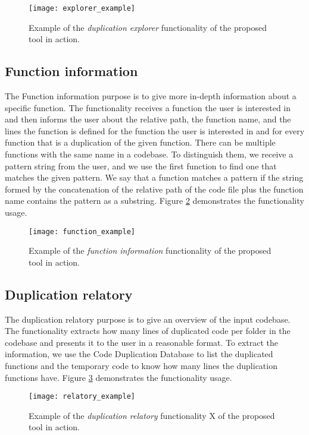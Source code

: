 \begin{figure}
\texttt{[image: explorer\_example]}
\caption{Example of the \textit{duplication explorer} functionality of the proposed tool in action.}
\label{fig:explorer_ex}
\end{figure}


\subsection{Function information}

\label{subsec:functioncommand}

The Function information purpose is to give more in-depth information about a specific 
function. The functionality receives a function the user is interested in and then 
informs the user about the relative path, the function name, and the lines the function 
is defined for the function the user is interested in and for every function that is a 
duplication of the given function. There can be multiple functions with the same name 
in a codebase. To distinguish them, we receive a pattern string from the user, and we 
use the first function to find one that matches the given pattern. We say that a 
function matches a pattern if the string formed by the concatenation of the relative 
path of the code file plus the function name contains the pattern as a substring. 
Figure \ref{fig:function_ex} demonstrates the functionality usage.

\begin{figure}
\texttt{[image: function\_example]}
\caption{Example of the \textit{function information} functionality of the proposed tool in action.}
\label{fig:function_ex}
\end{figure}


\subsection{Duplication relatory}

The duplication relatory purpose is to give an overview of the input codebase. 
The functionality extracts how many lines of duplicated code per folder in the 
codebase and presents it to the user in a reasonable format. To extract the 
information, we use the Code Duplication Database to list the duplicated functions 
and the temporary code to know how many lines the duplication functions have. 
Figure \ref{fig:relatory_ex} demonstrates the functionality usage. 

\begin{figure}
\texttt{[image: relatory\_example]}
\caption{Example of the \textit{duplication relatory} functionality X of the proposed tool in action.}
\label{fig:relatory_ex}
\end{figure}





